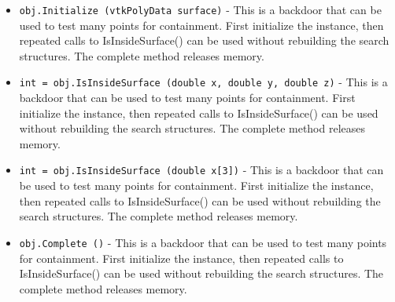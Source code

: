 \begin{itemize}
\item  \verb|obj.Initialize (vtkPolyData surface)| -  This is a backdoor that can be used to test many points for containment.
 First initialize the instance, then repeated calls to IsInsideSurface()
 can be used without rebuilding the search structures. The complete
 method releases memory.

\item  \verb|int = obj.IsInsideSurface (double x, double y, double z)| -  This is a backdoor that can be used to test many points for containment.
 First initialize the instance, then repeated calls to IsInsideSurface()
 can be used without rebuilding the search structures. The complete
 method releases memory.

\item  \verb|int = obj.IsInsideSurface (double x[3])| -  This is a backdoor that can be used to test many points for containment.
 First initialize the instance, then repeated calls to IsInsideSurface()
 can be used without rebuilding the search structures. The complete
 method releases memory.

\item  \verb|obj.Complete ()| -  This is a backdoor that can be used to test many points for containment.
 First initialize the instance, then repeated calls to IsInsideSurface()
 can be used without rebuilding the search structures. The complete
 method releases memory.

\end{itemize}
